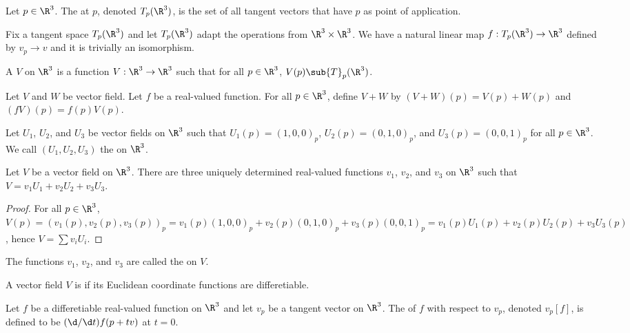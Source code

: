 \documentclass[12pt]{article}
\begin{document}
\begin{definition}
    Let $p\in{\R}^{3}$. The  at $p$, denoted ${T}_{p}({\R}^{3})$, is the set of all tangent vectors that have $p$ as point of application.
\end{definition}
\par
Fix a tangent space ${T}_{p}({\R}^{3})$ and let ${T}_{p}({\R}^{3})$ adapt the operations from ${\R}^{3}\times{\R}^{3}$. We have a natural linear map $f:{T}_{p}({\R}^{3})\to{\R}^{3}$ defined by ${v}_{p}\to v$ and it is trivially an isomorphism.
\begin{definition}
    A  $V$ on ${\R}^{3}$ is a function $V:{\R}^{3}\to{\R}^{3}$ such that for all $p\in{\R}^{3}$, $V(p)\sub{T}_{p}({\R}^{3})$.
\end{definition}
\par
Let $V$ and $W$ be vector field. Let $f$ be a real-valued function. For all $p\in{\R}^{3}$, define $V+W$ by $(V+W)(p)=V(p)+W(p)$ and $(fV)(p)=f(p)V(p)$.
\begin{definition}
    Let ${U}_{1}$, ${U}_{2}$, and ${U}_{3}$ be vector fields on ${\R}^{3}$ such that ${U}_{1}(p)={(1,0,0)}_{p}$, ${U}_{2}(p)={(0,1,0)}_{p}$, and ${U}_{3}(p)={(0,0,1)}_{p}$ for all $p\in{\R}^{3}$. We call $({U}_{1},{U}_{2},{U}_{3})$ the  on ${\R}^{3}$.
\end{definition}
\begin{proposition}
    Let $V$ be a vector field on ${\R}^{3}$. There are three uniquely determined real-valued functions ${v}_{1}$, ${v}_{2}$, and ${v}_{3}$ on ${\R}^{3}$ such that $V={v}_{1}{U}_{1}+{v}_{2}{U}_{2}+{v}_{3}{U}_{3}$.
\end{proposition}
\begin{proof}
    For all $p\in{\R}^{3}$, $V(p)={({v}_{1}(p),{v}_{2}(p),{v}_{3}(p))}_{p}={v}_{1}(p){(1,0,0)}_{p}+{v}_{2}(p){(0,1,0)}_{p}+{v}_{3}(p){(0,0,1)}_{p}={v}_{1}(p){U}_{1}(p)+{v}_{2}(p){U}_{2}(p)+{v}_{3}{U}_{3}(p)$, hence $V=\sum{v}_{i}{U}_{i}$.
\end{proof}
\par
The functions ${v}_{1}$, ${v}_{2}$, and ${v}_{3}$ are called the  on $V$.
\begin{definition}
    A vector field $V$ is  if its Euclidean coordinate functions are differetiable.
\end{definition}
\begin{definition}
    Let $f$ be a differetiable real-valued function on ${\R}^{3}$ and let ${v}_{p}$ be a tangent vector on ${\R}^{3}$. The  of $f$ with respect to ${v}_{p}$, denoted ${v}_{p}[f]$, is defined to be $(\d/\d t)f(p+tv)$ at $t=0$.
\end{definition}
\end{document}

